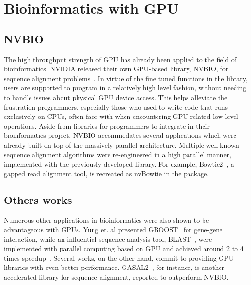 \documentclass{PHlab-thesis}
\begin{document}
\section{Bioinformatics with GPU}
\subsection{NVBIO}
The high throughput strength of GPU has already been applied to the field of bioinformatics. NVIDIA released their own GPU-based library, NVBIO, for sequence alignment problems~\cite{nvbio2015}. In virtue of the fine tuned functions in the library, users are supported to program in a relatively high level fashion, without needing to handle issues about physical GPU device access. This helps alleviate the frustration programmers, especially those who used to write code that runs exclusively on CPUs, often face with when encountering GPU related low level operations. Aside from libraries for programmers to integrate in their bioinformatics project, NVBIO accommodates several applications which were already built on top of the massively parallel architecture. Multiple well known sequence alignment algorithms were re-engineered in a high parallel manner, implemented with the previously developed library. For example, Bowtie2~\cite{langmead2012fast}, a gapped read alignment tool, is recreated as nvBowtie in the package.
\subsection{Others works}
Numerous other applications in bioinformatics were also shown to be advantageous with GPUs. Yung et. al presented GBOOST~\cite{yung2011gboost} for gene-gene interaction, while an influential sequence analysis tool, BLAST~\cite{altschul1990basic}, were implemented with parallel computing based on GPU and achieved around 2 to 4 times speedup~\cite{vouzis2011gpu}. Several works, on the other hand, commit to providing GPU libraries with even better performance. GASAL2~\cite{ahmed2019gasal2}, for instance, is another accelerated library for sequence alignment, reported to outperform NVBIO. 
\end{document}
